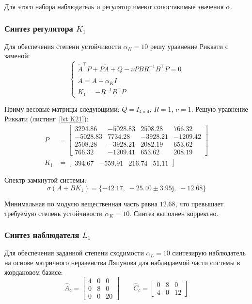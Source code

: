 \documentclass[a4paper,12pt]{article}
\begin{document}
	Для этого набора наблюдатель и регулятор имеют сопоставимые значения \(\alpha\).
	
	\subsubsection{Синтез регулятора \(K_1\)}

	Для обеспечения степени устойчивости $\alpha_K = 10$ решу уравнение Риккати с заменой:
	\[
	\begin{cases}
		\tilde{A}^\top P + P\tilde{A} + Q - \nu P B R^{-1} B^\top P = 0 \\
		\tilde{A} = A + \alpha_K I \\
		K_1 = -R^{-1}B^\top P
	\end{cases}
	\]
	
	Приму весовые матрицы следующими: $Q = I_{4\times4}$, $R = 1$, $\nu = 1$. Решую уравнение Риккати (листинг~\ref{lst:K21}):
	\[\begin{aligned}
		P &= \begin{bmatrix}
			3294.86 & -5028.83 & 2508.28 & 766.32 \\
			-5028.83 & 7734.28 & -3928.21 & -1209.42 \\
			2508.28 & -3928.21 & 2082.19 & 653.62 \\
			766.32 & -1209.41 & 653.62 & 208.19
		\end{bmatrix} \\[5pt]
		K_1 &= \begin{bmatrix} 394.67 & -559.91 & 216.74 & 51.11 \end{bmatrix}
	\end{aligned}
	\]
	
	Спектр замкнутой системы:
	\[
	\sigma(A + BK_1) = \{-42.17,\; -25.40 \pm 3.95\mathrm{j},\; -12.68\}
	\]
	
	Минимальная по модулю вещественная часть равна $12.68$, что превышает требуемую степень устойчивости $\alpha_K = 10$. Синтез выполнен корректно.
	
	\subsubsection{Синтез наблюдателя $L_1$}
	
	Для обеспечения заданной степени сходимости $\alpha_L = 10$ синтезирую наблюдатель на основе матричного неравенства Ляпунова для наблюдаемой части системы в жордановом базисе:
	\[
	\hat A_c =
	\begin{bmatrix}
		4 & 0 & 0 \\
		0 & 8 & 0 \\
		0 & 0 & 20
	\end{bmatrix} \qquad
	\hat C_c =
	\begin{bmatrix}
		0 & 8 & 0 \\
		4 & 0 & 12
	\end{bmatrix}
	\]
	
\end{document}
